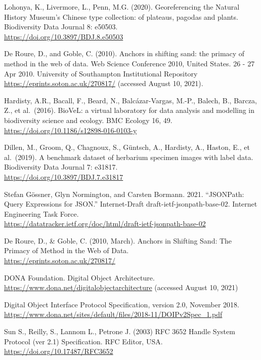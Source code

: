\begin{thebibliography}{9}
 Lohonya, K., Livermore, L., Penn, M.G. (2020). Georeferencing
the Natural History Museum's Chinese type collection: of plateaus,
pagodas and plants. Biodiversity Data Journal 8: e50503.\\
\url{https://doi.org/10.3897/BDJ.8.e50503}

 De Roure, D., and Goble, C. (2010). Anchors in shifting sand:
the primacy of method in the web of data. Web Science Conference 2010,
United States. 26 - 27 Apr 2010. University of Southampton Institutional
Repository\\
\url{https://eprints.soton.ac.uk/270817/} (accessed August 10, 2021).

 Hardisty, A.R., Bacall, F., Beard, N., Balcázar-Vargas, M.-P.,
Balech, B., Barcza, Z., et al.~(2016). BioVeL: a virtual laboratory for
data analysis and modelling in biodiversity science and ecology. BMC
Ecology 16, 49.\\
\url{https://doi.org/10.1186/s12898-016-0103-y}

 Dillen, M., Groom, Q., Chagnoux, S., Güntsch, A., Hardisty, A.,
Haston, E., et al.~(2019). A benchmark dataset of herbarium specimen
images with label data. Biodiversity Data Journal 7: e31817.\\
\url{https://doi.org/10.3897/BDJ.7.e31817}

 Stefan Gössner, Glyn Normington, and Carsten Bormann. 2021.
``JSONPath: Query Expressions for JSON.'' Internet-Draft
draft-ietf-jsonpath-base-02. Internet Engineering Task Force.\\
\url{https://datatracker.ietf.org/doc/html/draft-ietf-jsonpath-base-02}

 De Roure, D., \& Goble, C. (2010, March). Anchors in Shifting
Sand: The Primacy of Method in the Web of Data.\\
\url{https://eprints.soton.ac.uk/270817/}

 DONA Foundation. Digital Object Architecture.\\
\url{https://www.dona.net/digitalobjectarchitecture} (accessed August
10, 2021)

 Digital Object Interface Protocol Specification, version 2.0,
November 2018.\\
\url{https://www.dona.net/sites/default/files/2018-11/DOIPv2Spec_1.pdf}

 Sun S., Reilly, S., Lannom L., Petrone J. (2003) RFC 3652
Handle System Protocol (ver 2.1) Specification. RFC Editor, USA.\\
\url{https://doi.org/10.17487/RFC3652}


\end{thebibliography}
